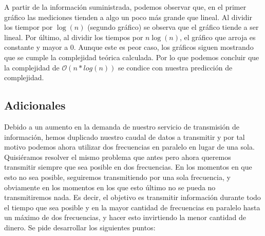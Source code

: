 A partir de la información suministrada, podemos observar que, en el primer gráfico las mediciones tienden a algo un poco más grande que lineal. Al dividir los tiempor por $\log(n)$ (segundo gráfico) se observa que el gráfico tiende a ser lineal. Por último, al dividir los tiempos por $n \log(n)$, el gráfico que arroja es constante y mayor a 0. Aunque este es peor caso, los gráficos siguen mostrando que se cumple la complejidad teórica calculada. Por lo que podemos concluir que la complejidad de $\mathcal{O}(n*log(n))$ se condice con nuestra predicción de complejidad.

\subsection{Adicionales}

Debido a un aumento en la demanda de nuestro servicio de transmisión de información, hemos duplicado
nuestro caudal de datos a transmitir y por tal motivo podemos ahora utilizar dos frecuencias en paralelo
en lugar de una sola. Quisiéramos resolver el mismo problema que antes pero ahora queremos transmitir
siempre que sea posible en dos frecuencias. En los momentos en que esto no sea posible, seguiremos
transmitiendo por una sola frecuencia, y obviamente en los momentos en los que esto último no se pueda
no transmitiremos nada. Es decir, el objetivo es transmitir información durante todo el tiempo que sea
posible y en la mayor cantidad de frecuencias en paralelo hasta un máximo de dos frecuencias, y hacer
esto invirtiendo la menor cantidad de dinero. Se pide desarrollar los siguientes puntos:

